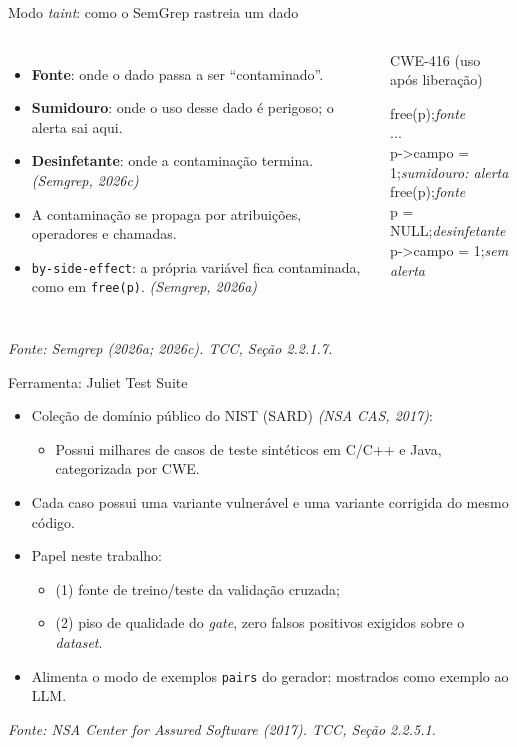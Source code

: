 \documentclass[
    aspectratio=169,
    12pt,
    brazil
]{beamer}
\newcommand{\fonte}[1]{{\tiny\itshape Fonte: #1\par}}
\newcommand{\cit}[1]{{\scriptsize\itshape (#1)}}
\begin{document}
\begin{frame}{Modo \textit{taint}: como o SemGrep rastreia um dado}
  \footnotesize
  \begin{columns}[T]
    \begin{itemize}
      \item \textbf{Fonte}: onde o dado passa a ser ``contaminado''.
      \item \textbf{Sumidouro}: onde o uso desse dado é perigoso; o alerta sai aqui.
      \item \textbf{Desinfetante}: onde a contaminação termina. \cit{Semgrep, 2026c}
      \item A contaminação se propaga por atribuições, operadores e chamadas.
      \item \texttt{by-side-effect}: a própria variável fica contaminada, como em \texttt{free(p)}. \cit{Semgrep, 2026a}
    \end{itemize}
    \begin{block}{CWE-416 (uso após liberação)}
      {\ttfamily\scriptsize
      free(p);\hfill{\rmfamily\itshape fonte}\\
      ...\\
      p->campo = 1;\hfill{\rmfamily\itshape sumidouro: alerta}\\[5pt]
      free(p);\hfill{\rmfamily\itshape fonte}\\
      p = NULL;\hfill{\rmfamily\itshape desinfetante}\\
      p->campo = 1;\hfill{\rmfamily\itshape sem alerta}\par}
    \end{block}
  \end{columns}
  \vfill
  \fonte{Semgrep (2026a; 2026c). TCC, Seção 2.2.1.7.}
\end{frame}

\begin{frame}{Ferramenta: Juliet Test Suite}
  \begin{itemize}
    \item Coleção de domínio público do NIST (SARD) \cit{NSA CAS, 2017}:
    \begin{itemize}
      \item Possui milhares de casos de teste sintéticos em C/C++ e Java, categorizada por CWE.
    \end{itemize} 
    \item Cada caso possui uma variante vulnerável e uma variante corrigida do mesmo código.
    \item Papel neste trabalho: 
    \begin{itemize}
      \item (1) fonte de treino/teste da validação cruzada; 
      \item (2) piso de qualidade do \textit{gate}, zero falsos positivos exigidos sobre o \textit{dataset}.
    \end{itemize}
    \item Alimenta o modo de exemplos \texttt{pairs} do gerador: mostrados como exemplo ao LLM.
  \end{itemize}
  \vfill
  \fonte{NSA Center for Assured Software (2017). TCC, Seção 2.2.5.1.}
\end{frame}
\end{document}
